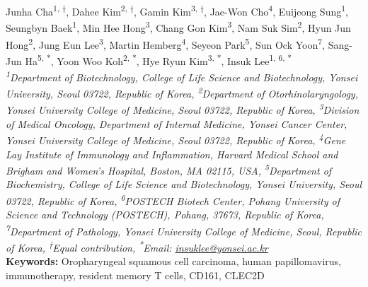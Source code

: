 \begin{center}
Junha Cha\href{https://orcid.org/0000-0002-3106-5865}{\textcolor{orcidlogocol}{\aiOrcid}}\textsuperscript{1, †}, Dahee Kim\textsuperscript{2, †}, Gamin Kim\textsuperscript{3, †}, Jae-Won Cho\textsuperscript{4}, Euijeong Sung\textsuperscript{1}, Seungbyn Baek\textsuperscript{1}, Min Hee Hong\textsuperscript{3}, Chang Gon Kim\textsuperscript{3}, Nam Suk Sim\textsuperscript{2}, Hyun Jun Hong\textsuperscript{2}, Jung Eun Lee\textsuperscript{3}, Martin Hemberg\textsuperscript{4}, Seyeon Park\textsuperscript{5}, Sun Ock Yoon\textsuperscript{7}, Sang-Jun Ha\textsuperscript{5, *}, Yoon Woo Koh\textsuperscript{2, *}, Hye Ryun Kim\textsuperscript{3, *}, Insuk Lee\textsuperscript{1, 6, *} \\
\vspace{0.2cm}
\textit{\textsuperscript{1}Department of Biotechnology, College of Life Science and Biotechnology, Yonsei University, Seoul 03722, Republic of Korea, \textsuperscript{2}Department of Otorhinolaryngology, Yonsei University College of Medicine, Seoul 03722, Republic of Korea, \textsuperscript{3}Division of Medical Oncology, Department of Internal Medicine, Yonsei Cancer Center, Yonsei University College of Medicine, Seoul 03722, Republic of Korea, \textsuperscript{4}Gene Lay Institute of Immunology and Inflammation, Harvard Medical School and Brigham and Women’s Hospital, Boston, MA 02115, USA, \textsuperscript{5}Department of Biochemistry, College of Life Science and Biotechnology, Yonsei University, Seoul 03722, Republic of Korea, \textsuperscript{6}POSTECH Biotech Center, Pohang University of Science and Technology (POSTECH), Pohang, 37673, Republic of Korea, \textsuperscript{7}Department of Pathology, Yonsei University College of Medicine, Seoul, Republic of Korea, \textsuperscript{†}Equal contribution, \textsuperscript{*}Email: \href{mailto:insuklee@yonsei.ac.kr}{insuklee@yonsei.ac.kr}} \\
\vspace{0.2cm}
\textbf{Keywords:} Oropharyngeal squamous cell carcinoma, human papillomavirus, immunotherapy, resident memory T cells, CD161, CLEC2D
\end{center}

